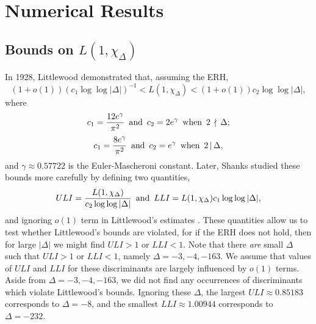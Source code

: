 \documentclass{mcom-l}
\theoremstyle{definition}
\begin{document}
\section{Numerical Results} \label{sec:results}

\subsection{Bounds on $L(1,\chi_\Delta)$}
In 1928, Littlewood \cite{littlewood} demonstrated that, assuming the
ERH,
\begin{equation} \label{eq:littlewood}
(1 + o(1))(c_1\log\log|\Delta|)^{-1} < L(1,\chi_\Delta) < (1 + o(1)) c_2\log\log|\Delta|,
\end{equation}
where
$$
c_1 = \frac{12e^\gamma}{\pi^2}\,\,\,\textnormal{and}\,\,\,c_2=2e^\gamma\,\,\,\textnormal{when}\,\,\,2\,\nmid\,\Delta;
$$
$$
c_1 = \frac{8e^\gamma}{\pi^2}\,\,\,\textnormal{and}\,\,\,c_2=e^\gamma\,\,\,\textnormal{when}\,\,\,2\,|\,\Delta,
$$
and $\gamma \approx 0.57722$ is the Euler-Mascheroni constant. Later,
Shanks studied these bounds more carefully by defining two quantities,
$$
ULI = \frac{L(1,\chi_\Delta)}{c_2\log\log|\Delta|}\,\,\,\textnormal{and}\,\,\,LLI=L(1,\chi_\Delta)c_1\log\log|\Delta|,
$$
and ignoring $o(1)$ term in Littlewood's estimates
\cite{shanks}. These quantities allow us to test whether Littlewood's
bounds are violated, for if the ERH does not hold, then for large
$|\Delta|$ we might find $ULI > 1$ or $LLI < 1$. Note that there
\emph{are} small $\Delta$ such that $ULI > 1$ or $LLI < 1$, namely
$\Delta = -3, -4, -163$. We assume that values of $ULI$ and $LLI$ for
these discriminants are largely influenced by $o(1)$ terms. Aside from
$\Delta = -3, -4, -163$, we did not find any occurrences of
discriminants which violate Littlewood's bounds. Ignoring these
$\Delta$, the largest $ULI \approx 0.85183$ corresponds to $\Delta =
-8$, and the smallest $LLI \approx 1.00944$ corresponds to $\Delta =
-232$.
\end{document}
